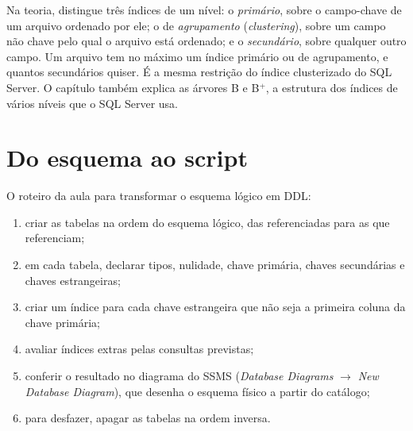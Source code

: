 Na teoria, \textcite[cap. 18]{Elmasri2011} distingue três índices de um
nível: o \emph{primário}, sobre o campo-chave de um arquivo ordenado por
ele; o de \emph{agrupamento} (\emph{clustering}), sobre um campo não
chave pelo qual o arquivo está ordenado; e o \emph{secundário}, sobre
qualquer outro campo. Um arquivo tem no máximo um índice primário ou de
agrupamento, e quantos secundários quiser. É a mesma restrição do índice
clusterizado do SQL Server. O capítulo também explica as árvores B e
B$^+$, a estrutura dos índices de vários níveis que o SQL Server usa.

\section{Do esquema ao script}

O roteiro da aula para transformar o esquema lógico em DDL:

\begin{enumerate}
	\item criar as tabelas na ordem do esquema lógico, das referenciadas
	para as que referenciam;
	\item em cada tabela, declarar tipos, nulidade, chave primária,
	chaves secundárias e chaves estrangeiras;
	\item criar um índice para cada chave estrangeira que não seja a
	primeira coluna da chave primária;
	\item avaliar índices extras pelas consultas previstas;
	\item conferir o resultado no diagrama do SSMS (\emph{Database
	Diagrams} $\rightarrow$ \emph{New Database Diagram}), que desenha o
	esquema físico a partir do catálogo;
	\item para desfazer, apagar as tabelas na ordem inversa.
\end{enumerate}
